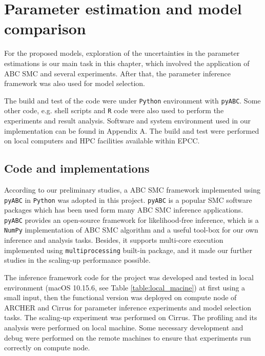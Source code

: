 \chapter{Parameter estimation and model comparison}

For the proposed models, exploration of the uncertainties in the parameter estimations is our main task in this chapter, which involved the application of ABC SMC and several experiments. After that, the parameter inference framework was also used for model selection.

The build and test of the code were under \verb|Python| environment with \verb|pyABC|\cite{ref:pyabc}. Some other code, e.g. shell scripts and \verb|R| code were also used to perform the experiments and result analysis. Software and system environment used in our implementation can be found in Appendix A. The build and test were performed on local computers and HPC facilities available within EPCC.

\section{Code and implementations}



According to our preliminary studies, a ABC SMC framework implemented using \verb|pyABC| in \verb|Python| was adopted in this project. \verb|pyABC| is a popular SMC software packages\cite{ref:pyabc} which has been used form many ABC SMC inference applications\cite{population}. \verb|pyABC| provides an open-source framework for likelihood-free inference, which is a \verb|NumPy| implementation of ABC SMC algorithm and a useful tool-box for our own inference and analysis tasks. Besides, it supports multi-core execution implemented using \verb|multiprocessing| built-in package, and it made our further studies in the scaling-up performance possible.


The inference framework code for the project was developed and tested in local environment (macOS 10.15.6, see Table \ref{table:local_macine}) at first using a small input, then the functional version was deployed on compute node of ARCHER and Cirrus for parameter inference experiments and model selection tasks. The scaling-up experiment was performed on Cirrus. The profiling and its analysis were performed on local machine. Some necessary development and debug were performed on the remote machines to ensure that experiments run correctly on compute node.

